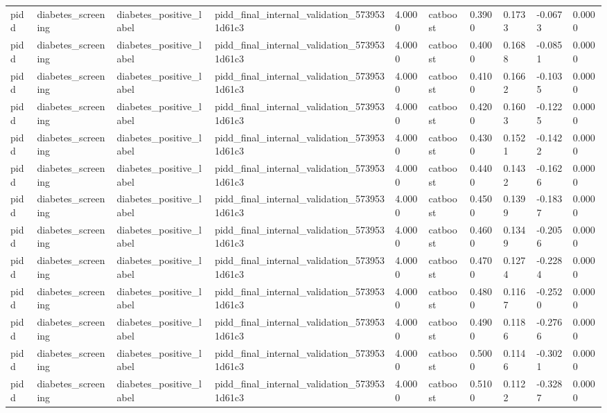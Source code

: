 \begin{tabular}{llllllllll}
pidd & diabetes\_screening & diabetes\_positive\_label & pidd\_final\_internal\_validation\_5739531d61c3 & 4.0000 & catboost & 0.3900 & 0.1733 & -0.0673 & 0.0000 \\
pidd & diabetes\_screening & diabetes\_positive\_label & pidd\_final\_internal\_validation\_5739531d61c3 & 4.0000 & catboost & 0.4000 & 0.1688 & -0.0851 & 0.0000 \\
pidd & diabetes\_screening & diabetes\_positive\_label & pidd\_final\_internal\_validation\_5739531d61c3 & 4.0000 & catboost & 0.4100 & 0.1662 & -0.1035 & 0.0000 \\
pidd & diabetes\_screening & diabetes\_positive\_label & pidd\_final\_internal\_validation\_5739531d61c3 & 4.0000 & catboost & 0.4200 & 0.1603 & -0.1225 & 0.0000 \\
pidd & diabetes\_screening & diabetes\_positive\_label & pidd\_final\_internal\_validation\_5739531d61c3 & 4.0000 & catboost & 0.4300 & 0.1521 & -0.1422 & 0.0000 \\
pidd & diabetes\_screening & diabetes\_positive\_label & pidd\_final\_internal\_validation\_5739531d61c3 & 4.0000 & catboost & 0.4400 & 0.1432 & -0.1626 & 0.0000 \\
pidd & diabetes\_screening & diabetes\_positive\_label & pidd\_final\_internal\_validation\_5739531d61c3 & 4.0000 & catboost & 0.4500 & 0.1399 & -0.1837 & 0.0000 \\
pidd & diabetes\_screening & diabetes\_positive\_label & pidd\_final\_internal\_validation\_5739531d61c3 & 4.0000 & catboost & 0.4600 & 0.1349 & -0.2056 & 0.0000 \\
pidd & diabetes\_screening & diabetes\_positive\_label & pidd\_final\_internal\_validation\_5739531d61c3 & 4.0000 & catboost & 0.4700 & 0.1274 & -0.2284 & 0.0000 \\
pidd & diabetes\_screening & diabetes\_positive\_label & pidd\_final\_internal\_validation\_5739531d61c3 & 4.0000 & catboost & 0.4800 & 0.1167 & -0.2520 & 0.0000 \\
pidd & diabetes\_screening & diabetes\_positive\_label & pidd\_final\_internal\_validation\_5739531d61c3 & 4.0000 & catboost & 0.4900 & 0.1186 & -0.2766 & 0.0000 \\
pidd & diabetes\_screening & diabetes\_positive\_label & pidd\_final\_internal\_validation\_5739531d61c3 & 4.0000 & catboost & 0.5000 & 0.1146 & -0.3021 & 0.0000 \\
pidd & diabetes\_screening & diabetes\_positive\_label & pidd\_final\_internal\_validation\_5739531d61c3 & 4.0000 & catboost & 0.5100 & 0.1122 & -0.3287 & 0.0000 \\

\end{tabular}
